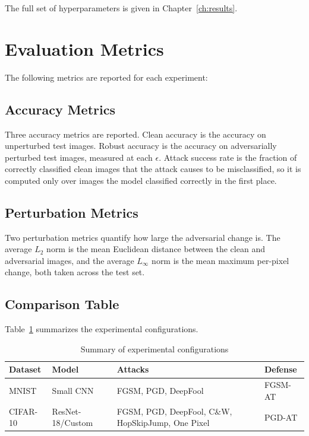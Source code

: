 The full set of hyperparameters is given in Chapter~\ref{ch:results}.

\section{Evaluation Metrics}

The following metrics are reported for each experiment:

\subsection{Accuracy Metrics}

Three accuracy metrics are reported. Clean accuracy is the accuracy on unperturbed test images. Robust accuracy is the accuracy on adversarially perturbed test images, measured at each $\epsilon$. Attack success rate is the fraction of correctly classified clean images that the attack causes to be misclassified, so it is computed only over images the model classified correctly in the first place.

\subsection{Perturbation Metrics}

Two perturbation metrics quantify how large the adversarial change is. The average $L_2$ norm is the mean Euclidean distance between the clean and adversarial images, and the average $L_\infty$ norm is the mean maximum per-pixel change, both taken across the test set.

\subsection{Comparison Table}

Table~\ref{tab:methodology_comparison} summarizes the experimental configurations.

\begin{table}[htbp]
    \centering
    \caption{Summary of experimental configurations}
    \label{tab:methodology_comparison}
    \begin{tabular}{@{}l l p{5.2cm} l@{}}
        \toprule
        \textbf{Dataset} & \textbf{Model} & \textbf{Attacks} & \textbf{Defense} \\
        \midrule
        MNIST & Small CNN & FGSM, PGD, DeepFool & FGSM-AT \\
        CIFAR-10 & ResNet-18/Custom & FGSM, PGD, DeepFool, C\&W, HopSkipJump, One Pixel & PGD-AT \\
        \bottomrule
    \end{tabular}
\end{table}

